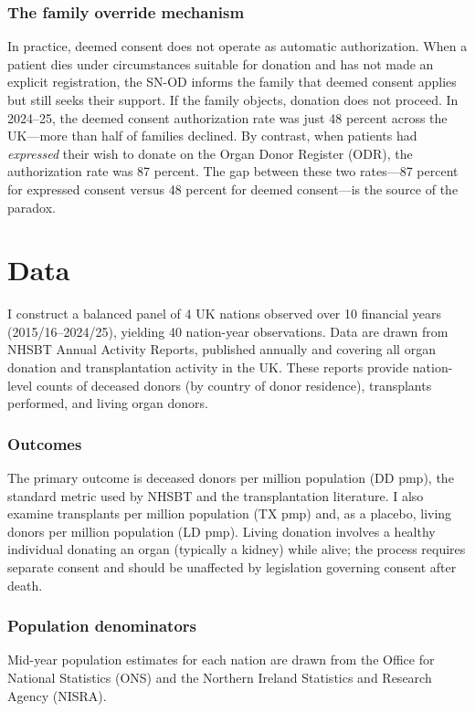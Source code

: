 \documentclass[12pt]{article}
\begin{document}
\subsubsection*{The family override mechanism} In practice, deemed consent does not operate as automatic authorization. When a patient dies under circumstances suitable for donation and has not made an explicit registration, the SN-OD informs the family that deemed consent applies but still seeks their support. If the family objects, donation does not proceed. In 2024--25, the deemed consent authorization rate was just 48 percent across the UK---more than half of families declined. By contrast, when patients had \textit{expressed} their wish to donate on the Organ Donor Register (ODR), the authorization rate was 87 percent. The gap between these two rates---87 percent for expressed consent versus 48 percent for deemed consent---is the source of the paradox.

\section{Data}

I construct a balanced panel of 4 UK nations observed over 10 financial years (2015/16--2024/25), yielding 40 nation-year observations. Data are drawn from NHSBT Annual Activity Reports, published annually and covering all organ donation and transplantation activity in the UK. These reports provide nation-level counts of deceased donors (by country of donor residence), transplants performed, and living organ donors.

\subsubsection*{Outcomes} The primary outcome is deceased donors per million population (DD pmp), the standard metric used by NHSBT and the transplantation literature. I also examine transplants per million population (TX pmp) and, as a placebo, living donors per million population (LD pmp). Living donation involves a healthy individual donating an organ (typically a kidney) while alive; the process requires separate consent and should be unaffected by legislation governing consent after death.

\subsubsection*{Population denominators} Mid-year population estimates for each nation are drawn from the Office for National Statistics (ONS) and the Northern Ireland Statistics and Research Agency (NISRA).
\end{document}
